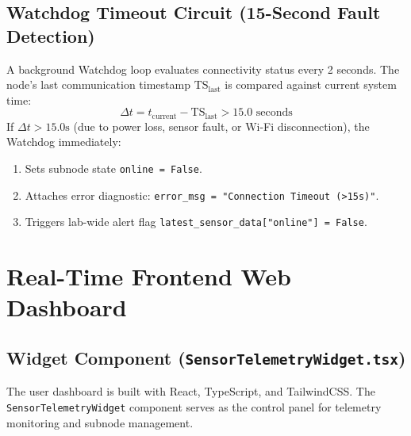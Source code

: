 \documentclass[11pt,a4paper]{article}
\begin{document}
\subsection{Watchdog Timeout Circuit (15-Second Fault Detection)}
A background Watchdog loop evaluates connectivity status every 2 seconds. The node's last communication timestamp $\text{TS}_{\text{last}}$ is compared against current system time:
\begin{equation}
    \Delta t = t_{\text{current}} - \text{TS}_{\text{last}} > 15.0 \text{ seconds}
\end{equation}
If $\Delta t > 15.0\text{s}$ (due to power loss, sensor fault, or Wi-Fi disconnection), the Watchdog immediately:
\begin{enumerate}
    \item Sets subnode state \texttt{online = False}.
    \item Attaches error diagnostic: \texttt{error\_msg = "Connection Timeout (>15s)"}.
    \item Triggers lab-wide alert flag \texttt{latest\_sensor\_data["online"] = False}.
\end{enumerate}

\vspace{1em}

\section{Real-Time Frontend Web Dashboard}

\subsection{Widget Component (\texttt{SensorTelemetryWidget.tsx})}
The user dashboard is built with React, TypeScript, and TailwindCSS. The {\small\texttt{SensorTelemetryWidget}} component serves as the control panel for telemetry monitoring and subnode management.
\end{document}
